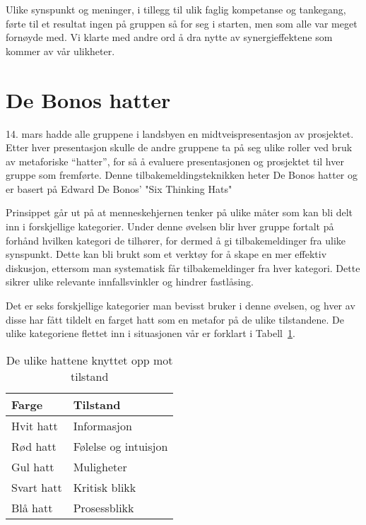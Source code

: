 Ulike synspunkt og meninger, i tillegg til ulik faglig kompetanse og tankegang, førte til et resultat ingen på gruppen så for seg i starten, men som alle var meget fornøyde med. Vi klarte med andre ord å dra nytte av synergieffektene som kommer av vår ulikheter.



\section{De Bonos hatter} %
14. mars hadde alle gruppene i landsbyen en midtveispresentasjon av
prosjektet. Etter hver presentasjon skulle de andre gruppene ta på seg
ulike roller ved bruk av metaforiske “hatter”, for så å evaluere
presentasjonen og prosjektet til hver gruppe som fremførte. Denne
tilbakemeldingsteknikken heter De Bonos hatter og er basert på Edward De
Bonos' "Six Thinking Hats" \cite{bonos}

Prinsippet går ut på at menneskehjernen tenker på ulike måter som kan
bli delt inn i forskjellige kategorier. Under denne øvelsen blir hver
gruppe fortalt på forhånd hvilken kategori de tilhører, for dermed å gi
tilbakemeldinger fra ulike synspunkt. Dette kan bli brukt som et verktøy
for å skape en mer effektiv diskusjon, ettersom man systematisk får
tilbakemeldinger fra hver kategori. Dette sikrer ulike relevante
innfallsvinkler og hindrer fastlåsing.

Det er seks forskjellige kategorier man bevisst bruker i denne øvelsen,
og hver av disse har fått tildelt en farget hatt som en metafor på de
ulike tilstandene. De ulike kategoriene flettet inn i situasjonen vår er
forklart i Tabell~\ref{tab:hats}.
\\
\begin{table} [H]
\centering
\begin{tabular}{| l | l |}
\hline
\bf{Farge} & \bf{Tilstand} \\
\hline
Hvit hatt & Informasjon \\
Rød hatt & Følelse og intuisjon \\
Gul hatt & Muligheter \\
Svart hatt & Kritisk blikk \\
Blå hatt & Prosessblikk \\
\hline
\end{tabular}
\caption{De ulike hattene knyttet opp mot tilstand}
\label{tab:hats}
\end{table}

\vspace{1.0em}

